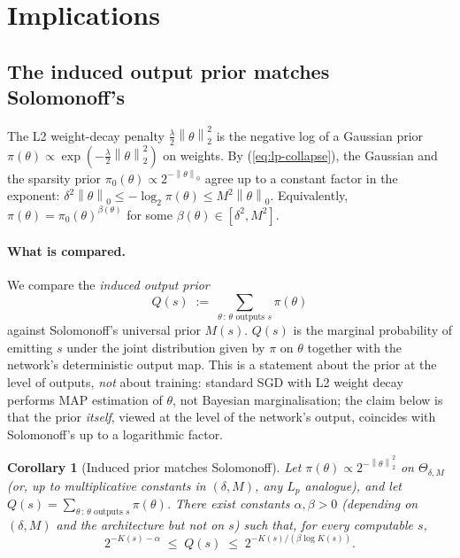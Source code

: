 \documentclass{article}
\newtheorem{corollary}[theorem]{Corollary}
\theoremstyle{definition}
\newcommand{\norm}[1]{\left\lVert#1\right\rVert}
\newcommand{\Param}{\Theta}
\begin{document}
\section{Implications}\label{sec:implications}

\subsection{The induced output prior matches Solomonoff's}\label{sec:implications:prior}

The L2 weight-decay penalty $\tfrac{\lambda}{2}\norm{\theta}_2^2$ is the
negative log of a Gaussian prior $\pi(\theta) \propto
  \exp(-\tfrac{\lambda}{2}\norm{\theta}_2^2)$ on weights. By
(\ref{eq:lp-collapse}), the Gaussian and the sparsity prior $\pi_0(\theta)
  \propto 2^{-\norm{\theta}_0}$ agree up to a constant factor in the exponent:
$\delta^2 \norm{\theta}_0 \le -\log_2 \pi(\theta) \le M^2 \norm{\theta}_0$.
Equivalently, $\pi(\theta) = \pi_0(\theta)^{\beta(\theta)}$ for some
$\beta(\theta) \in [\delta^2, M^2]$.

\paragraph{What is compared.} We compare the \emph{induced output prior}
\[
  Q(s) \;:=\; \sum_{\theta \,:\, \theta \text{ outputs } s} \pi(\theta)
\]
against Solomonoff's universal prior $M(s)$. $Q(s)$ is the marginal probability
of emitting $s$ under the joint distribution given by $\pi$ on $\theta$
together with the network's deterministic output map. This is a statement about
the prior at the level of outputs, \emph{not} about training: standard SGD with
L2 weight decay performs MAP estimation of $\theta$, not Bayesian
marginalisation; the claim below is that the prior \emph{itself}, viewed at the
level of the network's output, coincides with Solomonoff's up to a logarithmic
factor.

\begin{corollary}[Induced prior matches Solomonoff]\label{cor:prior}
  Let $\pi(\theta) \propto 2^{-\norm{\theta}_2^2}$ on $\Param_{\delta, M}$ (or,
  up to multiplicative constants in $(\delta, M)$, any $L_p$ analogue), and let
  $Q(s) = \sum_{\theta\,:\,\theta\text{ outputs } s} \pi(\theta)$. There exist
  constants $\alpha, \beta > 0$ (depending on $(\delta, M)$ and the architecture
  but \emph{not} on $s$) such that, for every computable $s$,
  \[
    2^{-K(s) - \alpha} \;\le\; Q(s) \;\le\; 2^{-K(s) / (\beta \log K(s))}.
  \]
\end{corollary}
\end{document}
